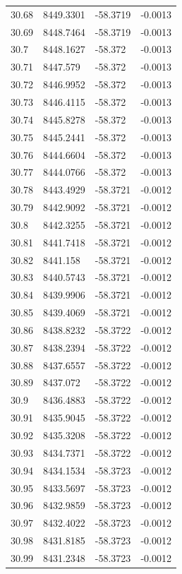 \begin{table}[H]
\begin{tabular}{llll}
30.68 & 8449.3301 & -58.3719 & -0.0013 \\
30.69 & 8448.7464 & -58.3719 & -0.0013 \\
30.7 & 8448.1627 & -58.372 & -0.0013 \\
30.71 & 8447.579 & -58.372 & -0.0013 \\
30.72 & 8446.9952 & -58.372 & -0.0013 \\
30.73 & 8446.4115 & -58.372 & -0.0013 \\
30.74 & 8445.8278 & -58.372 & -0.0013 \\
30.75 & 8445.2441 & -58.372 & -0.0013 \\
30.76 & 8444.6604 & -58.372 & -0.0013 \\
30.77 & 8444.0766 & -58.372 & -0.0013 \\
30.78 & 8443.4929 & -58.3721 & -0.0012 \\
30.79 & 8442.9092 & -58.3721 & -0.0012 \\
30.8 & 8442.3255 & -58.3721 & -0.0012 \\
30.81 & 8441.7418 & -58.3721 & -0.0012 \\
30.82 & 8441.158 & -58.3721 & -0.0012 \\
30.83 & 8440.5743 & -58.3721 & -0.0012 \\
30.84 & 8439.9906 & -58.3721 & -0.0012 \\
30.85 & 8439.4069 & -58.3721 & -0.0012 \\
30.86 & 8438.8232 & -58.3722 & -0.0012 \\
30.87 & 8438.2394 & -58.3722 & -0.0012 \\
30.88 & 8437.6557 & -58.3722 & -0.0012 \\
30.89 & 8437.072 & -58.3722 & -0.0012 \\
30.9 & 8436.4883 & -58.3722 & -0.0012 \\
30.91 & 8435.9045 & -58.3722 & -0.0012 \\
30.92 & 8435.3208 & -58.3722 & -0.0012 \\
30.93 & 8434.7371 & -58.3722 & -0.0012 \\
30.94 & 8434.1534 & -58.3723 & -0.0012 \\
30.95 & 8433.5697 & -58.3723 & -0.0012 \\
30.96 & 8432.9859 & -58.3723 & -0.0012 \\
30.97 & 8432.4022 & -58.3723 & -0.0012 \\
30.98 & 8431.8185 & -58.3723 & -0.0012 \\
30.99 & 8431.2348 & -58.3723 & -0.0012 \\

\end{tabular}
\end{table}

